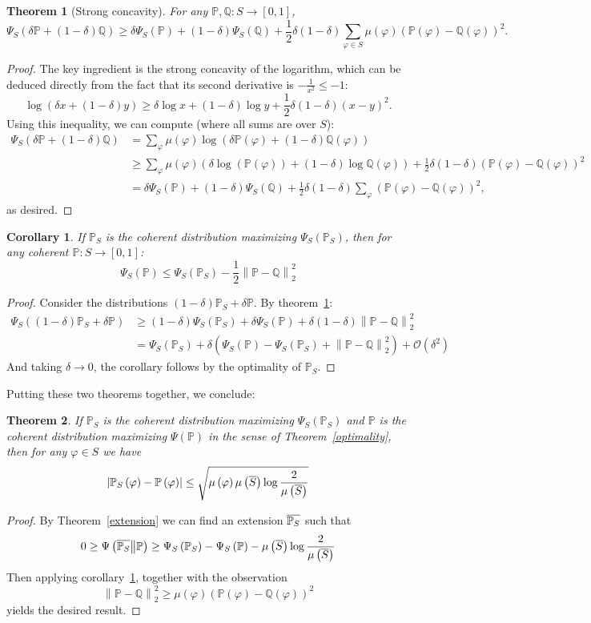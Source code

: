 \documentclass[12pt]{article}
\newtheorem{theorem}{Theorem}
\newtheorem{corollary}{Corollary}
\theoremstyle{definition}
\newcommand{\ltwod}[2]{\left\|#1 - #2\right\|_2^2}
\newcommand{\sPQ}{\ltwod{\PP}{\QQ}}
\newcommand{\QQ}{\mathbb{Q}}
\newcommand{\Q}[1]{\QQ\of{#1}}
\renewcommand{\O}{\mathcal{O}}
\newcommand{\Of}[1]{\O\of{#1}}
\newcommand{\of}[1]{\left(#1\right)}
\newcommand{\ofcc}[2]{\left(#1\middle\| #2\right)}
\newcommand{\PP}{\mathbb{P}}
\newcommand{\muv}{\mu\of{\vp}}
\renewcommand{\P}[1]{\mathbb{P}\of{#1}}
\newcommand{\vp}{\varphi}
\newcommand{\abs}[1]{\left\vert#1\right\vert}
\newcommand{\reg}[1]{\Psi\of{#1}}
\newcommand{\regs}[1]{\Psi_S\of{#1}}
\newcommand{\relreg}[2]{\Psi\ofcc{#1}{#2}}
\begin{document}
{\begin{theorem}[Strong concavity]\label{strong-concavity}
For any $\PP, \QQ : S \rightarrow [0, 1]$,
\[ \regs{\delta \PP + (1 - \delta) \QQ} \geq \delta \regs{\PP} + (1 - \delta) \regs{\QQ}
+ \frac 12 \delta (1 - \delta) \sum_{\vp \in S} \mu\of{\vp} \of{\P{\vp} - \QQ\of{\vp}}^2. \]
\end{theorem}
\begin{proof}
The key ingredient is the strong concavity of the logarithm,
which can be deduced directly from the fact that its second derivative is $- \frac 1{x^2} \leq -1$:
\[ \log\of{\delta x + (1 - \delta) y} \geq \delta \log{x} + (1 - \delta) \log{y} + \frac 12 \delta (1 - \delta) (x - y)^2. \]
Using this inequality, we can compute (where all sums are over $S$):
\begin{align*}
\regs{\delta \PP + (1 - \delta) \QQ}
&= \sum_{\vp} { \mu\of{\vp} \log\of{\delta \P{\vp} +  (1 - \delta) \Q{\vp} }} \\
&\geq \sum_{\vp} { \mu\of{\vp} \of{\delta \log\of{\P{\vp}} + (1 - \delta) \log{\Q{\vp}}}} + \frac 12 \delta ( 1 - \delta) \of{\P{\vp} - \Q{\vp}}^2 \\
&= \delta \regs{\PP} + (1 - \delta) \regs{\QQ} + \frac 12 \delta (1 - \delta) \sum_{\vp} \of{\P{\vp} - \Q{\vp}}^2,
\end{align*}
as desired.
\end{proof}
\begin{corollary}\label{smoothness}
If $\PP_S$ is the coherent distribution maximizing $\regs{\PP_S}$,
then for any coherent $\PP : S \rightarrow [0, 1]$:
\[ \regs{\PP} \leq \regs{\PP_S} - \frac 12 \sPQ \]
\end{corollary}
\begin{proof}
Consider the distributions $(1 - \delta) \PP_S + \delta \PP$.
By theorem~\ref{strong-concavity}:
\begin{align*}
\regs{(1 - \delta) \PP_S + \delta \PP}
&\geq (1 - \delta) \regs{\PP_S} + \delta \regs{\PP} + \delta (1 - \delta) \sPQ \\
&= \regs{\PP_S} + \delta \of{\regs{\PP} - \regs{\PP_S} + \sPQ} + \Of{\delta^2}
\end{align*}
And taking $\delta \rightarrow 0$, the corollary follows
by the optimality of $\PP_S$.
\end{proof}

Putting these two theorems together, we conclude:
\begin{theorem}
If $\PP_S$ is the coherent distribution maximizing $\regs{\PP_S}$
and $\PP$ is the coherent distribution maximizing $\reg{\PP}$
in the sense of Theorem~\ref{optimality},
then for any $\vp \in S$ we have
\[ \abs{\PP_S\of{\vp} - \PP\of{\vp}} \leq \sqrt{\muv \muoS \log{\frac 2{\muoS}}} \]
\end{theorem}
\begin{proof}
By Theorem~\ref{extension} we can find an extension $\oPPS$ such that
\[ 0 \geq \relreg{\oPPS}{\PP} \geq \regs{\PP_S} - \regs{\PP} - \muoS \log{\frac 2{\muoS}} \]
Then applying corollary~\ref{smoothness}, together with the observation
\[ \sPQ \geq \mu\of{\vp} \of{\P{\vp} - \Q{\vp}}^2 \]
yields the desired result.
\end{proof}
}
\end{document}
